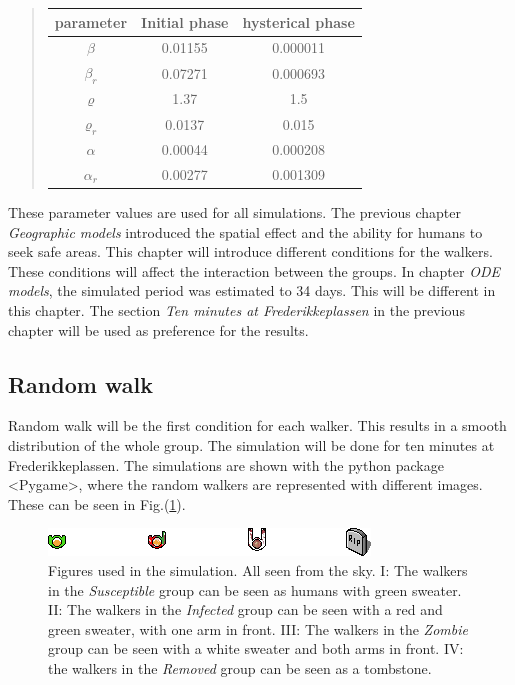 \documentclass[%
twoside,                 %
final,                   %
chapterprefix=true,      %
open=right               %
10pt]{book}
\begin{document}
\label{table:param_val_random}

\begin{quote}
\begin{tabular}{ccc}
\hline
\multicolumn{1}{c}{ parameter } & \multicolumn{1}{c}{ Initial phase } & \multicolumn{1}{c}{ hysterical phase } \\
\hline
$\beta$     & 0.01155       & 0.000011         \\
$\beta_r$   & 0.07271       & 0.000693         \\
$\varrho$   & 1.37          & 1.5              \\
$\varrho_r$ & 0.0137        & 0.015            \\
$\alpha$    & 0.00044       & 0.000208         \\
$\alpha_r$  & 0.00277       & 0.001309         \\
\hline
\end{tabular}
\end{quote}

\noindent
These parameter values are used for all simulations. The previous chapter \emph{Geographic models} introduced the spatial effect and the ability for humans to seek safe areas. This chapter will introduce different conditions for the walkers. These conditions will affect the interaction between the groups. In chapter \emph{ODE models}, the simulated period was estimated to 34 days. This will be different in this chapter. The section \emph{Ten minutes at Frederikkeplassen} in the previous chapter will be used as preference for the results. 

\subsection{Random walk}
Random walk will be the first condition for each walker. This results in a smooth distribution of the whole group. The simulation will be done for ten minutes at Frederikkeplassen. The simulations are shown with the python package <Pygame>, where the random walkers are represented with different images. These can be seen in Fig.(\ref{fig:figure_images}).


\begin{figure}[ht]
  \centerline{\includegraphics[width=0.8\linewidth]{3_fig/figure_images.png}}
  \caption{
  \label{fig:figure_images} Figures used in the simulation. All seen from the sky. I: The walkers in the \emph{Susceptible} group can be seen as humans with green sweater. II: The walkers in the \emph{Infected} group can be seen with a red and green sweater, with one arm in front. III: The walkers in the \emph{Zombie} group can be seen with a white sweater and both arms in front. IV: the walkers in the \emph{Removed} group can be seen as a tombstone.
  }
\end{figure}
\end{document}
